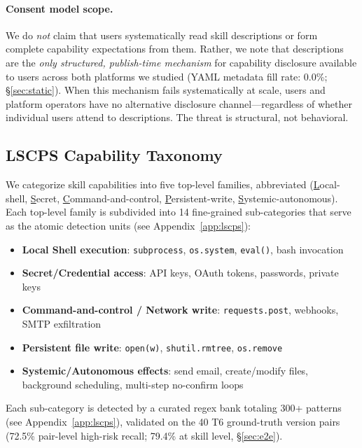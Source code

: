 \paragraph{Consent model scope.}
We do \emph{not} claim that users systematically read skill descriptions
or form complete capability expectations from them.
Rather, we note that descriptions are the \emph{only structured,
publish-time mechanism} for capability disclosure available to users across
both platforms we studied (YAML metadata fill rate: 0.0\%;
\S\ref{sec:static}).
When this mechanism fails systematically at scale, users and platform
operators have no alternative disclosure channel---regardless of
whether individual users attend to descriptions.
The threat is structural, not behavioral.

\subsection{LSCPS Capability Taxonomy}

We categorize skill capabilities into five top-level families,
abbreviated \textbf{\lscps{}}
(\underline{L}ocal-shell, \underline{S}ecret, \underline{C}ommand-and-control,
\underline{P}ersistent-write, \underline{S}ystemic-autonomous).
Each top-level family is subdivided into 14 fine-grained sub-categories
that serve as the atomic detection units (see Appendix~\ref{app:lscps}):

\begin{itemize}[topsep=2pt,itemsep=2pt]
\item[\textbf{L}] \textbf{Local Shell execution}:
  \texttt{subprocess}, \texttt{os.system}, \texttt{eval()}, bash invocation
\item[\textbf{S}] \textbf{Secret/Credential access}:
  API keys, OAuth tokens, passwords, private keys
\item[\textbf{C}] \textbf{Command-and-control / Network write}:
  \texttt{requests.post}, webhooks, SMTP exfiltration
\item[\textbf{P}] \textbf{Persistent file write}:
  \texttt{open(w)}, \texttt{shutil.rmtree}, \texttt{os.remove}
\item[\textbf{S}] \textbf{Systemic/Autonomous effects}:
  send email, create/modify files, background scheduling, multi-step no-confirm loops
\end{itemize}

Each sub-category is detected by a curated regex bank totaling 300+ patterns
(see Appendix~\ref{app:lscps}),
validated on the 40 T6 ground-truth version pairs
(72.5\% pair-level high-risk recall; 79.4\% at skill level,
\S\ref{sec:e2e}).

